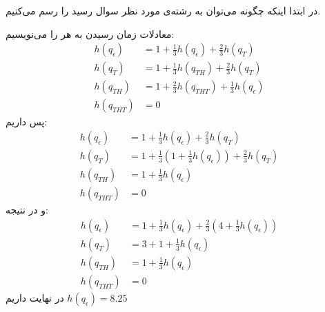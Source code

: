 در ابتدا
اینکه چگونه می‌توان به رشته‌ی مورد نظر سوال رسید را رسم می‌کنیم.
\begin{latin}
    \begin{center}
    \end{center}
\end{latin}
معادلات زمان رسیدن به هر
را می‌نویسیم:
\begin{align*}
    h(q_\epsilon) &= 1 + \frac{1}{3} h(q_\epsilon) + \frac{2}{3} h(q_{T})\\
    h(q_{T}) &= 1 + \frac{1}{3} h(q_{TH}) + \frac{2}{3} h(q_{T})\\
    h(q_{TH}) &= 1 + \frac{2}{3} h(q_{THT}) + \frac{1}{3} h(q_{\epsilon})\\
    h(q_{THT}) &= 0
\end{align*}
پس داریم:
\begin{align*}
    h(q_\epsilon) &= 1 + \frac{1}{3} h(q_\epsilon) + \frac{2}{3} h(q_{T})\\
    h(q_{T}) &= 1 + \frac{1}{3} (1 + \frac{1}{3} h(q_{\epsilon})) + \frac{2}{3} h(q_{T})\\
    h(q_{TH}) &= 1 + \frac{1}{3} h(q_{\epsilon})\\
    h(q_{THT}) &= 0
\end{align*}
و در نتیجه:
\begin{align*}
    h(q_\epsilon) &= 1 + \frac{1}{3} h(q_\epsilon) + \frac{2}{3} (4 + \frac{1}{3} h(q_{\epsilon}))\\
    h(q_{T}) &= 3 + 1 + \frac{1}{3} h(q_{\epsilon})\\
    h(q_{TH}) &= 1 + \frac{1}{3} h(q_{\epsilon})\\
    h(q_{THT}) &= 0
\end{align*}
در نهایت داریم
$h(q_\epsilon) = 8.25$